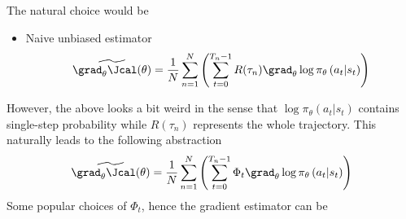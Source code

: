 The natural choice would be
\begin{itemize}
    \item Naive unbiased estimator
    $$
    \widetilde{\grad_{\theta} \Jcal(\theta)}  = \frac{1}{N}\sum_{n=1}^{N} \left(  \sum_{t=0}^{T_{n}-1} R(\tau_n) \grad_{\theta} \log \pi_\theta\left(a_t | s_t\right) \right)
    $$
\end{itemize}
However, the above looks a bit weird in the sense that $\log \pi_\theta\left(a_t | s_t\right)$ contains single-step probability while $R(\tau_n)$ represents the whole trajectory. This naturally leads to the following abstraction
 $$
    \widetilde{\grad_{\theta} \Jcal(\theta)}  = \frac{1}{N}\sum_{n=1}^{N} \left(  \sum_{t=0}^{T_{n}-1} \Phi_t \grad_{\theta} \log \pi_\theta\left(a_t | s_t\right) \right)
$$
Some popular choices of $\Phi_t$\citep{schulman2015high}, hence the gradient estimator can be
